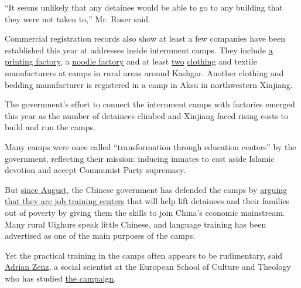 ``It seems unlikely that any detainee would be able to go to any
building that they were not taken to,'' Mr. Ruser said.

Commercial registration records also show at least a few companies have
been established this year at addresses inside internment camps. They
include
\href{https://xin.baidu.com/detail/compinfo?pid=N4qLKt5szCV8cY9yeyLwcmh10gPAQIFMIw7H}{a
printing factory}, a
\href{https://xin.baidu.com/detail/compinfo?pid=lAMlHRitOZ*osCEY8tZVKeUAhr9D0tF-ewXX}{noodle
factory} and at least
\href{https://gongshang.mingluji.com/xinjiang/name/\%E8\%8E\%8E\%E8\%BD\%A6\%E5\%AE\%9C\%E5\%8F\%B0\%E5\%98\%89\%E7\%A6\%BE\%E7\%BA\%BA\%E7\%BB\%87\%E6\%9C\%89\%E9\%99\%90\%E5\%85\%AC\%E5\%8F\%B8}{two}
\href{https://web.archive.org/web/20181215064833/https://gongshang.mingluji.com/xinjiang/name/\%E6\%96\%B0\%E7\%96\%86\%E6\%81\%92\%E6\%98\%8C\%E4\%BC\%9F\%E4\%B8\%9A\%E6\%9C\%8D\%E8\%A3\%85\%E6\%9C\%89\%E9\%99\%90\%E5\%85\%AC\%E5\%8F\%B8}{clothing}
and textile manufacturers at camps in rural areas around Kashgar.
Another clothing and bedding manufacturer is registered in a camp in
Aksu in northwestern Xinjiang.

The government's effort to connect the internment camps with factories
emerged this year as the number of detainees climbed and Xinjiang faced
rising costs to build and run the camps.

Many camps were once called ``transformation through education centers''
by the government, reflecting their mission: inducing inmates to cast
aside Islamic devotion and accept Communist Party supremacy.

But
\href{https://www.nytimes3xbfgragh.onion/2018/08/13/world/asia/china-xinjiang-un.html}{since
August}, the Chinese government has defended the camps by
\href{https://www.nytimes3xbfgragh.onion/2018/10/16/world/asia/china-muslim-camps-xinjiang-uighurs.html}{arguing
that they are job training centers} that will help lift detainees and
their families out of poverty by giving them the skills to join China's
economic mainstream. Many rural Uighurs speak little Chinese, and
language training has been advertised as one of the main purposes of the
camps.

Yet the practical training in the camps often appears to be rudimentary,
said \href{https://www.awm-korntal.eu/en/person/1302.html}{Adrian Zenz},
a social scientist at the European School of Culture and Theology who
has studied
\href{https://jamestown.org/program/xinjiangs-re-education-and-securitization-campaign-evidence-from-domestic-security-budgets/}{the
campaign}.

